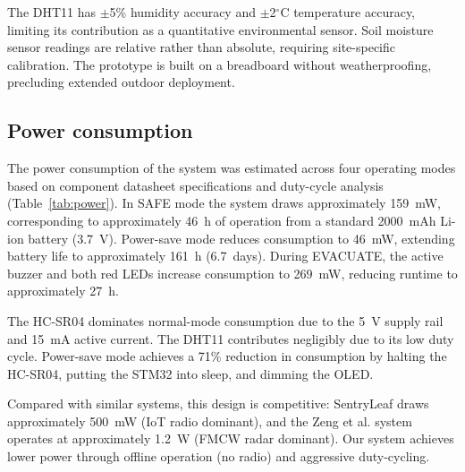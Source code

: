 \documentclass[5p,twocolumn]{elsarticle}
\begin{document}
The DHT11 has $\pm$5\% humidity accuracy and $\pm$2$^\circ$C temperature accuracy, limiting its contribution as a quantitative environmental sensor. Soil moisture sensor readings are relative rather than absolute, requiring site-specific calibration. The prototype is built on a breadboard without weatherproofing, precluding extended outdoor deployment.

\subsection{Power consumption}

The power consumption of the system was estimated across four operating modes based on component datasheet specifications and duty-cycle analysis (Table~\ref{tab:power}). In SAFE mode the system draws approximately 159~mW, corresponding to approximately 46~h of operation from a standard 2000~mAh Li-ion battery (3.7~V). Power-save mode reduces consumption to 46~mW, extending battery life to approximately 161~h (6.7~days). During EVACUATE, the active buzzer and both red LEDs increase consumption to 269~mW, reducing runtime to approximately 27~h.

The HC-SR04 dominates normal-mode consumption due to the 5~V supply rail and 15~mA active current. The DHT11 contributes negligibly due to its low duty cycle. Power-save mode achieves a 71\% reduction in consumption by halting the HC-SR04, putting the STM32 into sleep, and dimming the OLED.

Compared with similar systems, this design is competitive: SentryLeaf \cite{rohan2025} draws approximately 500~mW (IoT radio dominant), and the Zeng et al. system \cite{zeng2025} operates at approximately 1.2~W (FMCW radar dominant). Our system achieves lower power through offline operation (no radio) and aggressive duty-cycling.
\end{document}
